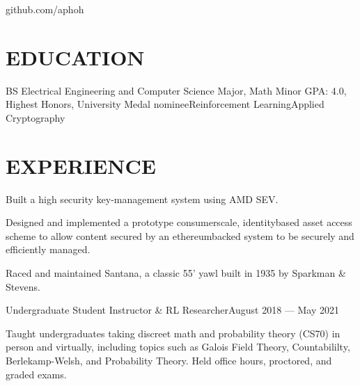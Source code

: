 \documentclass[10pt]{article}
\begin{document}
				 {github.com/aphoh}      

\section*{EDUCATION}

    {BS {\textendash} Electrical Engineering and Computer Science Major, Math Minor}
{GPA: 4.0, Highest Honors, University Medal nominee}{Reinforcement Learning}{Applied Cryptography}


\section*{EXPERIENCE}

          \begin{accomplishments}
            \item Built a high security key-management system using AMD SEV.
            \item Designed and implemented a prototype consumer{\textendash}scale, identity{\textendash}based asset access scheme to allow content secured by an ethereum{\textendash}backed system to be securely and efficiently managed. 
          \end{accomplishments}

            \begin{accomplishments}
              \item Raced and maintained Santana, a classic 55' yawl built in 1935 by Sparkman \& Stevens.
            \end{accomplishments}

            {Undergraduate Student Instructor \& RL Researcher}{August 2018 --- May 2021}
              \begin{accomplishments}
                \item Taught undergraduates taking discreet math and probability theory (CS70) in person and virtually, including topics such as Galois Field Theory, Countabililty, Berlekamp-Welsh, and Probability Theory. Held office hours, proctored, and graded exams.
            \end{accomplishments}
\end{document}
